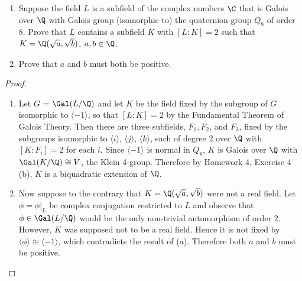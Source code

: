 \documentclass[10pt]{amsart}
\begin{document}
\begin{thm}
  \label{Ex8}
  \begin{enumerate}
  \item
    Suppose the field $L$ is a subfield of the complex numbers $\C$ that is Galois over $\Q$ with Galois group (isomorphic to) the quaternion group $Q_8$ of order 8.
    Prove that $L$ contains a subfield $K$ with $[L:K] = 2$ such that $K = \Q(\sqrt{a},\sqrt{b})$, $a,b \in \Q$.
  \item
    Prove that $a$ and $b$ must both be positive.
  \end{enumerate}
  
  \begin{proof}
    \begin{enumerate}
    \item
      Let $G$ = $\Gal(L/\Q)$ and let $K$ be the field fixed by the subgroup of $G$ isomorphic to $\langle-1\rangle$, so that $[L:K] = 2$ by the Fundamental Theorem of Galois Theory.
      Then there are three subfields, $F_1, F_2$, and $F_3$, fixed by the subgroups isomorphic to $\langle i \rangle$, $\langle j \rangle$, $\langle k \rangle$, each of degree 2 over $\Q$ with $[K:F_i] = 2$ for each $i$.
      Since $\langle -1 \rangle$ is normal in $Q_8$, $K$ is Galois over $\Q$ with $\Gal(K/\Q) \cong V$, the Klein 4-group.
      Therefore by Homework 4, Exercise 4 (b), $K$ is a biquadratic extension of $\Q$.
    \item
      Now suppose to the contrary that $K = \Q(\sqrt{a}, \sqrt{b})$ were not a real field.
      Let $\phi = \phi\vert_L$ be complex conjugation restricted to $L$ and observe that $\phi \in \Gal(L/\Q)$ would be the only non-trivial automorphism of order 2.
      However, $K$ was supposed not to be a real field.
      Hence it is not fixed by $\langle\phi\rangle \cong \langle -1 \rangle$, which contradicts the result of (a).
      Therefore both $a$ and $b$ must be positive.
    \end{enumerate}
  \end{proof}
\end{thm}
\end{document}
